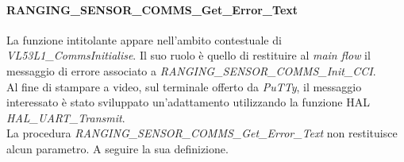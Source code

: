 \documentclass[11pt]{report}
\begin{document}
\paragraph{RANGING\_SENSOR\_COMMS\_Get\_Error\_Text}
La funzione intitolante appare nell'ambito contestuale di \textit{VL53L1\_CommsInitialise}. Il suo ruolo è quello di restituire al \textit{main flow} il messaggio di errore associato a \textit{RANGING\_SENSOR\_COMMS\_Init\_CCI}.\\
Al fine di stampare a video, sul terminale offerto da \textit{PuTTy}, il messaggio interessato è stato sviluppato un'adattamento utilizzando la funzione HAL \textit{HAL\_UART\_Transmit}.\\
La procedura \textit{RANGING\_SENSOR\_COMMS\_Get\_Error\_Text} non restituisce alcun parametro.
A seguire la sua definizione.

\end{document}

